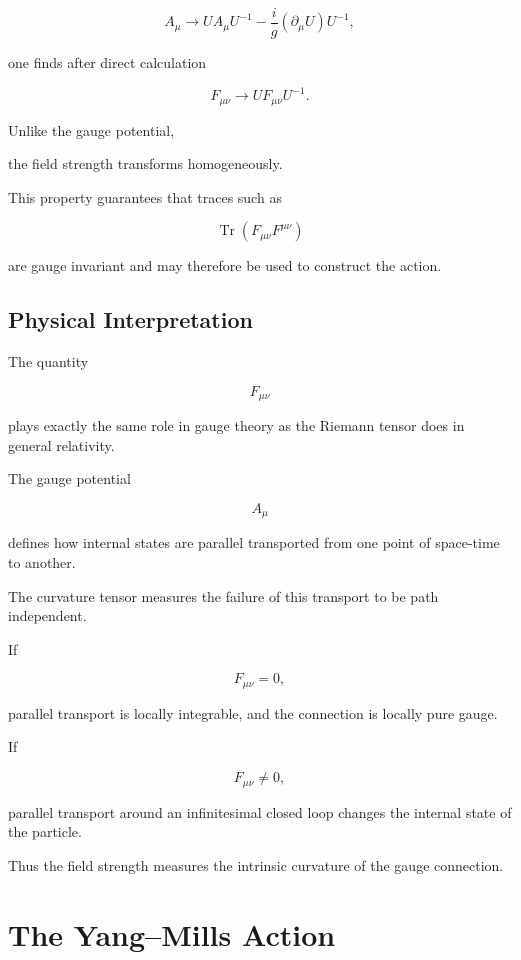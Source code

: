 \[
A_\mu
\rightarrow
UA_\mu U^{-1}
-
\frac{i}{g}
(\partial_\mu U)
U^{-1},
\]

one finds after direct calculation

\[
\boxed{
F_{\mu\nu}
\rightarrow
UF_{\mu\nu}U^{-1}.
}
\]

Unlike the gauge potential,

the field strength transforms homogeneously.

This property guarantees that traces such as

\[
\operatorname{Tr}
(F_{\mu\nu}F^{\mu\nu})
\]

are gauge invariant and may therefore be used to construct the action.


\subsection{Physical Interpretation}

The quantity

\[
F_{\mu\nu}
\]

plays exactly the same role in gauge theory as the Riemann tensor does in
general relativity.

The gauge potential

\[
A_\mu
\]

defines how internal states are parallel transported from one point of
space-time to another.

The curvature tensor measures the failure of this transport to be path
independent.

If

\[
F_{\mu\nu}=0,
\]

parallel transport is locally integrable, and the connection is locally
pure gauge.

If

\[
F_{\mu\nu}\neq0,
\]

parallel transport around an infinitesimal closed loop changes the
internal state of the particle.

Thus the field strength measures the intrinsic curvature of the gauge
connection.


\section{The Yang--Mills Action}

